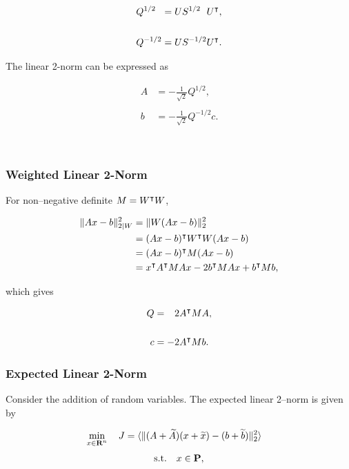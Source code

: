 \documentclass{article}
\begin{document}
    \begin{align*}
        Q^{1/2\minus}&=US^{1/2\minus} U^\tp,\\\\
        Q^{-1/2}&=U S^{-1/2} U^\tp.
    \end{align*}  

    The linear 2-norm can be expressed as

    \begin{align*}
        A&=\minus\frac{1}{\sqrt{2}}Q^{1/2},\\\\
        b&= -\frac{1}{\sqrt{2}}Q^{-1/2} c.
    \end{align*}

    \\

    \subsubsection{Weighted Linear 2-Norm}
    For non--negative definite $M=W^\intercal W$, 

    \begin{align*}
        \|Ax-b\|_{2|W}^2 
        &=\|W(Ax-b)\|_2^2\\
        &=(Ax-b)^\intercal W^\intercal W (Ax-b)\\
        &= (Ax-b)^\intercal M (Ax-b)\\
        &= x^\intercal A^\intercal M A x - 2 b^\intercal M A x + b^\intercal M b,
    \end{align*}

    which gives

    \begin{align*}
        Q&=\minus 2 A^\tp M A,\\\\
        c&=-2A^\tp M b.
    \end{align*}

    \clearpage
    \subsubsection{Expected Linear 2-Norm}

    Consider the addition of random variables.
    The expected linear 2--norm is given by

    \begin{align*}
        \min_{x\in\textbf{R}^n}\quad J&=\langle\|(A+\widetilde{A})(x+\widetilde{x})-(b+\widetilde{b})\|_{2}^2\rangle
    \end{align*}
    \begin{align*}
        \text{s.t.}\quad x\in\textbf{P},
    \end{align*}
\end{document}
